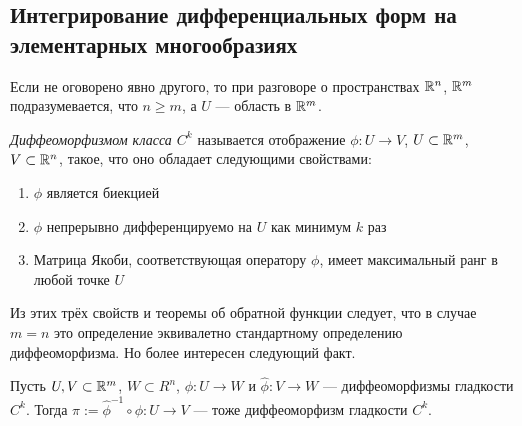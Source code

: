 \subsection{Интегрирование дифференциальных форм на элементарных многообразиях}

\begin{note}
	Если не оговорено явно другого, то при разговоре о пространствах $\mathbb{R}^n$, $\mathbb{R}^m$ подразумевается, что $n \ge m$, а $U$ --- область в $\mathbb{R}^m$.
\end{note}

\begin{definition}
	\textit{Диффеоморфизмом класса $C^k$} называется отображение $\phi \colon U \to V$, $U \subset \mathbb{R}^m$, $V \subset \mathbb{R}^n$, такое, что оно обладает следующими свойствами:
	\begin{enumerate}
		\item $\phi$ является биекцией
		
		\item $\phi$ непрерывно дифференцируемо на $U$ как минимум $k$ раз
		
		\item Матрица Якоби, соответствующая оператору $\phi$, имеет максимальный ранг в любой точке $U$
	\end{enumerate}
\end{definition}

\begin{note}
	Из этих трёх свойств и теоремы об обратной функции следует, что в случае $m = n$ это определение эквивалетно стандартному определению диффеоморфизма. Но более интересен следующий факт.
\end{note}

\begin{lemma} \label{main_diffeomorphism_lemma}
	Пусть $U, V \subset \mathbb{R}^m$, $W \subset R^n$, $\phi \colon U \to W$ и $\hat\phi \colon V \to W$ --- диффеоморфизмы гладкости $C^k$. Тогда $\pi := \hat\phi^{-1}\circ\phi \colon U \to V$ --- тоже диффеоморфизм гладкости $C^k$.
\end{lemma}

